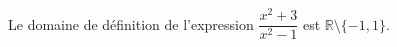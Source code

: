 Le domaine de définition de l'expression $\dfrac{x^2+3}{x^2-1}$ est $\mathbb R \setminus \{-1,1\}$.

\begin{reponses}
\end{reponses}

